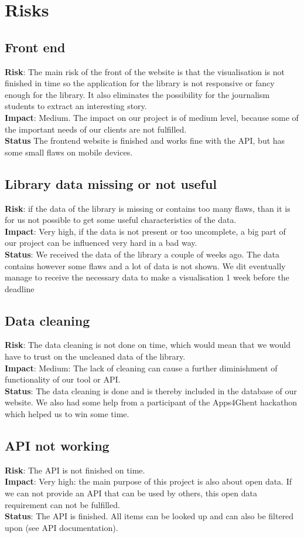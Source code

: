 \section{Risks}

  \subsection{Front end}
	{\bf Risk}: The main risk of the front of the website is that the visualisation is not finished in time so the application for the library is not responsive or fancy enough for the library. It also eliminates the possibility for the journalism students to extract an interesting story.\\
	{\bf Impact}: Medium. The impact on our project is of medium level, because some of the important needs of our clients are not fulfilled.\\
	{\bf Status} The frontend website is finished and works fine with the API, but has some small flaws on mobile devices. 
  \subsection{Library data missing or not useful}
	{\bf Risk}: if the data of the library is missing or contains too many flaws, than it is for us not possible to get some useful characteristics of the data.\\
	{\bf Impact}: Very high, if the data is not present or too uncomplete, a big part of our project can be influenced very hard in a bad way.\\
	{\bf Status}: We received the data of the library a couple of weeks ago. The data contains however some flaws and a lot of data is not shown. We dit eventually manage to receive the necessary data to make a visualisation 1 week before the deadline
  \subsection{Data cleaning}
	{\bf Risk}: The data cleaning is not done on time, which would mean that we would have to trust on the uncleaned data of the library.\\
	{\bf Impact}: Medium: The lack of cleaning can cause a further diminishment of functionality of our tool or API.\\
	{\bf Status}: The data cleaning is done and is thereby included in the database of our website. We also had some help from a participant of the Apps4Ghent hackathon which helped us to win some time.
  \subsection{API not working}
	{\bf Risk}: The API is not finished on time.\\
	{\bf Impact}: Very high: the main purpose of this project is also about open data. If we can not provide an API that can be used by others, this open data requirement can not be fulfilled.\\
	{\bf Status}: The API is finished. All items can be looked up and can also be filtered upon (see API documentation).
\newpage
